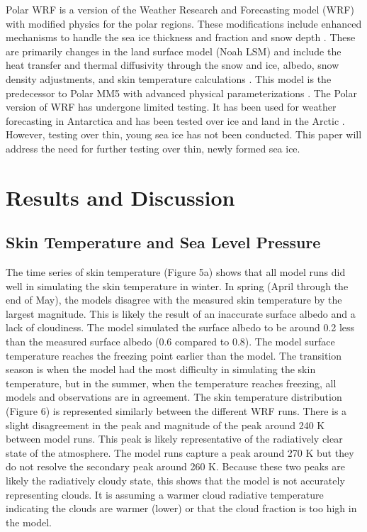 Polar WRF is a version of the Weather Research and Forecasting model (WRF) with modified physics for the polar regions. These modifications include enhanced mechanisms to handle the sea ice thickness and fraction and snow depth \cite{Hines:2015jz}. These are primarily changes in the land surface model (Noah LSM) and include the heat transfer and thermal diffusivity through the snow and ice, albedo, snow density adjustments, and skin temperature calculations \cite{Tastula:2012fta} \cite{Hines:2015jz}. This model is the predecessor to Polar MM5 with advanced physical parameterizations \cite{Bromwich:2009hp}. The Polar version of WRF has undergone limited testing. It has been used for weather forecasting in Antarctica \cite{Powers:2012hn} and has been tested over ice and land in the Arctic \cite{Tastula:2012fta} \cite{Bromwich:2009hp}. However, testing over thin, young sea ice has not been conducted. This paper will address the need for further testing over thin, newly formed sea ice. 




\section{Results and Discussion}

\subsection{Skin Temperature and Sea Level Pressure}

The time series of skin temperature (Figure 5a) shows that all model runs did well in simulating the skin temperature in winter. In spring (April through the end of May), the models disagree with the measured skin temperature by the largest magnitude. This is likely the result of an inaccurate surface albedo and a lack of cloudiness. The model simulated the surface albedo to be around 0.2 less than the measured surface albedo (0.6 compared to 0.8). The model surface temperature reaches the freezing point earlier than the model. The transition season is when the model had the most difficulty in simulating the skin temperature, but in the summer, when the temperature reaches freezing, all models and observations are in agreement. The skin temperature distribution (Figure 6) is represented similarly between the different WRF runs. There is a slight disagreement in the peak and magnitude of the peak around 240 K between model runs. This peak is likely representative of the radiatively clear state of the atmosphere. The model runs capture a peak around 270 K but they do not resolve the secondary peak around 260 K. Because these two peaks are likely the radiatively cloudy state, this shows that the model is not accurately representing clouds. It is assuming a warmer cloud radiative temperature indicating the clouds are warmer (lower) or that the cloud fraction is too high in the model.

